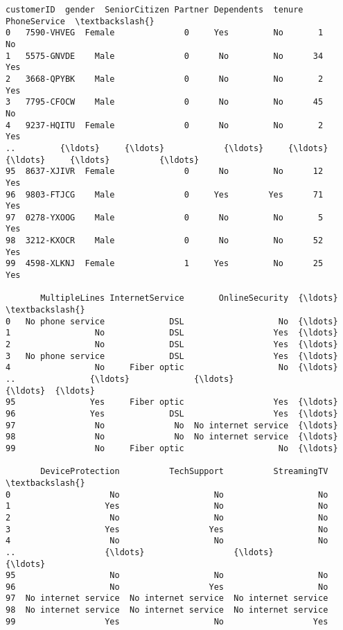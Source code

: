 \documentclass[11pt]{article}
\makeatletter
\newcommand{\boxspacing}{\kern\kvtcb@left@rule\kern\kvtcb@boxsep}
\newcommand{\prompt}[4]{
        {\ttfamily\llap{{\color{#2}[#3]:\hspace{3pt}#4}}\vspace{-\baselineskip}}
    }
\makeatother
\begin{document}
            \begin{tcolorbox}[breakable, size=fbox, boxrule=.5pt, pad at break*=1mm, opacityfill=0]
\prompt{Out}{outcolor}{6}{\boxspacing}
\begin{Verbatim}[commandchars=\\\{\}]
    customerID  gender  SeniorCitizen Partner Dependents  tenure PhoneService  \textbackslash{}
0   7590-VHVEG  Female              0     Yes         No       1           No
1   5575-GNVDE    Male              0      No         No      34          Yes
2   3668-QPYBK    Male              0      No         No       2          Yes
3   7795-CFOCW    Male              0      No         No      45           No
4   9237-HQITU  Female              0      No         No       2          Yes
..         {\ldots}     {\ldots}            {\ldots}     {\ldots}        {\ldots}     {\ldots}          {\ldots}
95  8637-XJIVR  Female              0      No         No      12          Yes
96  9803-FTJCG    Male              0     Yes        Yes      71          Yes
97  0278-YXOOG    Male              0      No         No       5          Yes
98  3212-KXOCR    Male              0      No         No      52          Yes
99  4598-XLKNJ  Female              1     Yes         No      25          Yes

       MultipleLines InternetService       OnlineSecurity  {\ldots}  \textbackslash{}
0   No phone service             DSL                   No  {\ldots}
1                 No             DSL                  Yes  {\ldots}
2                 No             DSL                  Yes  {\ldots}
3   No phone service             DSL                  Yes  {\ldots}
4                 No     Fiber optic                   No  {\ldots}
..               {\ldots}             {\ldots}                  {\ldots}  {\ldots}
95               Yes     Fiber optic                  Yes  {\ldots}
96               Yes             DSL                  Yes  {\ldots}
97                No              No  No internet service  {\ldots}
98                No              No  No internet service  {\ldots}
99                No     Fiber optic                   No  {\ldots}

       DeviceProtection          TechSupport          StreamingTV  \textbackslash{}
0                    No                   No                   No
1                   Yes                   No                   No
2                    No                   No                   No
3                   Yes                  Yes                   No
4                    No                   No                   No
..                  {\ldots}                  {\ldots}                  {\ldots}
95                   No                   No                   No
96                   No                  Yes                   No
97  No internet service  No internet service  No internet service
98  No internet service  No internet service  No internet service
99                  Yes                   No                  Yes


\end{Verbatim}
\end{tcolorbox}
\end{document}

